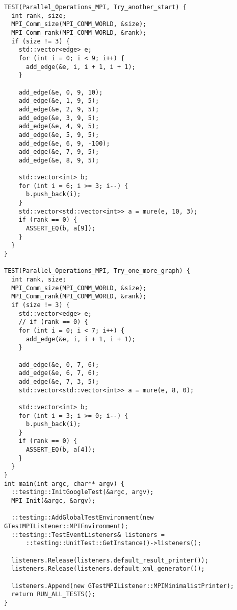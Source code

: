 \documentclass{report}
\begin{document}
\begin{lstlisting}
TEST(Parallel_Operations_MPI, Try_another_start) {
  int rank, size;
  MPI_Comm_size(MPI_COMM_WORLD, &size);
  MPI_Comm_rank(MPI_COMM_WORLD, &rank);
  if (size != 3) {
    std::vector<edge> e;
    for (int i = 0; i < 9; i++) {
      add_edge(&e, i, i + 1, i + 1);
    }

    add_edge(&e, 0, 9, 10);
    add_edge(&e, 1, 9, 5);
    add_edge(&e, 2, 9, 5);
    add_edge(&e, 3, 9, 5);
    add_edge(&e, 4, 9, 5);
    add_edge(&e, 5, 9, 5);
    add_edge(&e, 6, 9, -100);
    add_edge(&e, 7, 9, 5);
    add_edge(&e, 8, 9, 5);

    std::vector<int> b;
    for (int i = 6; i >= 3; i--) {
      b.push_back(i);
    }
    std::vector<std::vector<int>> a = mure(e, 10, 3);
    if (rank == 0) {
      ASSERT_EQ(b, a[9]);
    }
  }
}

TEST(Parallel_Operations_MPI, Try_one_more_graph) {
  int rank, size;
  MPI_Comm_size(MPI_COMM_WORLD, &size);
  MPI_Comm_rank(MPI_COMM_WORLD, &rank);
  if (size != 3) {
    std::vector<edge> e;
    // if (rank == 0) {
    for (int i = 0; i < 7; i++) {
      add_edge(&e, i, i + 1, i + 1);
    }

    add_edge(&e, 0, 7, 6);
    add_edge(&e, 6, 7, 6);
    add_edge(&e, 7, 3, 5);
    std::vector<std::vector<int>> a = mure(e, 8, 0);

    std::vector<int> b;
    for (int i = 3; i >= 0; i--) {
      b.push_back(i);
    }
    if (rank == 0) {
      ASSERT_EQ(b, a[4]);
    }
  }
}
int main(int argc, char** argv) {
  ::testing::InitGoogleTest(&argc, argv);
  MPI_Init(&argc, &argv);

  ::testing::AddGlobalTestEnvironment(new GTestMPIListener::MPIEnvironment);
  ::testing::TestEventListeners& listeners =
      ::testing::UnitTest::GetInstance()->listeners();

  listeners.Release(listeners.default_result_printer());
  listeners.Release(listeners.default_xml_generator());

  listeners.Append(new GTestMPIListener::MPIMinimalistPrinter);
  return RUN_ALL_TESTS();
}

\end{lstlisting}
\end{document}
